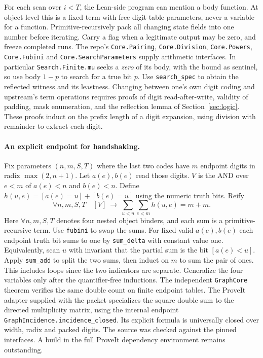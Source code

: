 For each scan over $i<T$, the Lean-side program can mention a body function.
At object level this is a fixed term with free digit-table parameters,
never a variable for a function. Primitive-recursively pack all changing
state fields into one number before iterating. Carry a flag when a legitimate
output may be zero, and freeze completed runs. The repo's
\texttt{Core.Pairing}, \texttt{Core.Division}, \texttt{Core.Powers},
\texttt{Core.Fubini} and \texttt{Core.SearchParameters} supply arithmetic
interfaces. In particular \texttt{Search.Finite.mu} seeks a \emph{zero}
of its body, with the bound as sentinel, so use body $1-p$ to search for
a true bit $p$. Use \texttt{search\_spec} to obtain the reflected
witness and its leastness. Changing between one's own digit coding and
upstream's term operations requires proofs of digit read-after-write,
validity of padding, mask enumeration, and the reflection lemma of
Section~\ref{sec:logic}. These proofs induct on the prefix length of a
digit expansion, using division with remainder to extract each digit.

\paragraph{An explicit endpoint for handshaking.}
Fix parameters $(n,m,S,T)$ where the last two codes have $m$ endpoint digits
in radix $\max(2,n+1)$. Let $a(e),b(e)$ read those digits.
$V$ is the AND over $e<m$ of $a(e)<n$ and $b(e)<n$. Define
$h(u,e)=[a(e)=u]+[b(e)=u]$ using the numeric truth bits. Reify
\[
 \forall n,m,S,T\quad [V]\ \longrightarrow\
 \sum_{u<n}\sum_{e<m}h(u,e)=m+m .
\]
Here $\forall n,m,S,T$ denotes four nested object binders, and each sum
is a primitive-recursive term. Use \texttt{fubini} to swap the sums.
For fixed valid $a(e),b(e)$ each endpoint truth bit sums to one by
\texttt{sum\_delta} with constant value one. Equivalently, scan $u$
with invariant that the partial sum is the bit $[a(e)<u]$.
Apply \texttt{sum\_add} to split the two sums, then induct on $m$ to sum
the pair of ones. This includes loops since the two indicators are separate.
Generalize the four variables only after the quantifier-free inductions.
The independent \texttt{GraphCore} theorem verifies the same double count
on finite endpoint tables. The ProveIt adapter supplied with the packet
specializes the square double sum to the directed multiplicity matrix,
using the internal endpoint \texttt{GraphIncidence.incidence\_closed}. Its explicit formula is universally closed over width, radix and packed digits. The source was checked against the pinned interfaces. A build in the full ProveIt dependency environment remains outstanding.

